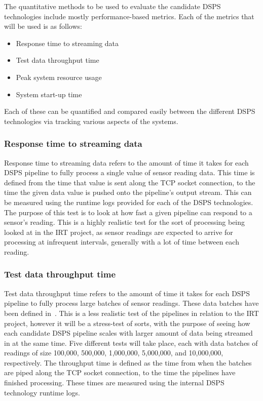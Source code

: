 The quantitative methods to be used to evaluate the candidate DSPS technologies include mostly performance-based
metrics. Each of the metrics that will be used is as follows:

\begin{itemize}
  \item Response time to streaming data
  \item Test data throughput time
  \item Peak system resource usage
  \item System start-up time
\end{itemize}

Each of these can be quantified and compared easily between the different DSPS technologies via tracking various aspects
of the systems.

\subsubsection{Response time to streaming data}

Response time to streaming data refers to the amount of time it takes for each DSPS pipeline to fully process a single
value of sensor reading data. This time is defined from the time that value is sent along the TCP socket connection, to the time
the given data value is pushed onto the pipeline's output stream. This can be measured using the runtime logs provided
for each of the DSPS technologies. The purpose of this test is to look at how fast a given pipeline can respond to a
sensor's reading. This is a highly realistic test for the sort of processing being looked at in the IRT project, as
sensor readings are expected to arrive for processing at infrequent intervals, generally with a lot of time between
each reading.

\subsubsection{Test data throughput time}

Test data throughput time refers to the amount of time it takes for each DSPS pipeline to fully process large batches
of sensor readings. These data batches have been defined in~. This is a less realistic
test of the pipelines in relation to the IRT project, however it will be a stress-test of sorts, with the purpose of
seeing how each candidate DSPS pipeline scales with larger amount of data being streamed in at the same time. Five different
tests will take place, each with data batches of readings of size 100,\@000, 500,\@000, 1,\@000,\@000, 5,\@000,\@000,
and 10,\@000,\@000, respectively. The throughput time is defined as the time from when the batches are piped along the TCP
socket connection, to the time the pipelines have finished processing. These times are measured using the internal DSPS
technology runtime logs.

